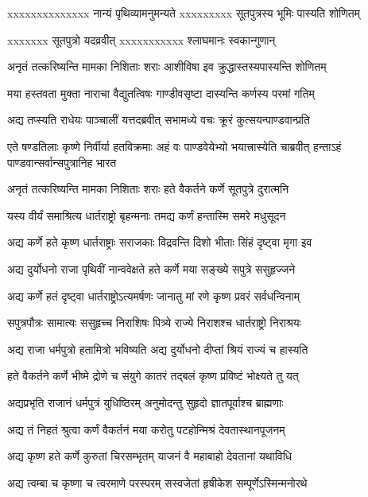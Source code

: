\twolineshloka
{xxxxxxxxxxxxxx नान्यं पृथिव्यामनुमन्यते}
{xxxxxxxxx सूतपुत्रस्य भूमिः पास्यति शोणितम्}


\twolineshloka
{xxxxxxx सूतपुत्रो यदव्रवीत्}
{xxxxxxxxxxx श्लाघमानः स्वकान्गुणान्}


\twolineshloka
{अनृतं तत्करिष्यन्ति मामका निशिताः शराः}
{आशीविषा इव क्रुद्धास्तस्यपास्यन्ति शोणितम्}


\twolineshloka
{मया हस्तवता मुक्ता नाराचा वैद्युतत्विषः}
{गाण्डीवसृष्टा दास्यन्ति कर्णस्य परमां गतिम्}


\twolineshloka
{अद्य तप्स्यति राधेयः पाञ्चालीं यत्तदब्रवीत्}
{सभामध्ये वचः क्रूरं कुत्सयन्पाण्डवान्प्रति}


\threelineshloka
{एते षण्डतिलाः कृष्णे निर्वीर्या हतविक्रमाः}
{अहं वः पाण्डवेयेभ्यो भयात्त्रास्येति चाब्रवीत्}
{हन्ताऽहं पाण्डवान्सर्वान्सपुत्रानिह भारत}


\twolineshloka
{अनृतं तत्करिष्यन्ति मामका निशिताः शराः}
{हते वैकर्तने कर्णे सूतपुत्रे दुरात्मनि}


\twolineshloka
{यस्य वीर्यं समाश्रित्य धार्तराष्ट्रो बृहन्मनाः}
{तमद्य कर्णं हन्तास्मि समरे मधुसूदन}


\twolineshloka
{अद्य कर्णे हते कृष्ण धार्तराष्ट्राः सराजकाः}
{विद्रवन्ति दिशो भीताः सिंहं दृष्ट्वा मृगा इव}


\twolineshloka
{अद्य दुर्योधनो राजा पृथिवीं नान्ववेक्षते}
{हते कर्णे मया सङ्ख्ये सपुत्रे ससुहृज्जने}


\twolineshloka
{अद्य कर्णे हतं दृष्ट्वा धार्तराष्ट्रोऽत्यमर्षणः}
{जानातु मां रणे कृष्ण प्रवरं सर्वधन्विनाम्}


\twolineshloka
{सपुत्रपौत्रः सामात्यः ससुहृच्च निराशिषः}
{पित्र्ये राज्ये निराशश्च धार्तराष्ट्रो निराश्रयः}


\twolineshloka
{अद्य राजा धर्मपुत्रो हतामित्रो भविष्यति}
{अद्य दुर्योधनो दीप्तां श्रियं राज्यं च हास्यति}


\twolineshloka
{हते वैकर्तने कर्णे भीष्मे द्रोणे च संयुगे}
{कातरं तद्बलं कृष्ण प्रविष्टं भोक्ष्यते तु यत्}


\twolineshloka
{अद्यप्रभृति राजानं धर्मपुत्रं युधिष्ठिरम्}
{अनुमोदन्तु सुहृदो ज्ञातपूर्वाश्च ब्राह्मणाः}


\twolineshloka
{अद्य तं निहतं श्रुत्वा कर्णं वैकर्तनं मया}
{करोतु पटहोन्मिश्रं देवतास्थानपूजनम्}


\twolineshloka
{अद्य कृष्ण हते कर्णे कुरुतां चिरसम्भृतम्}
{याजनं वै महाबाहो देवतानां यथाविधि}


\twolineshloka
{अद्य त्वम्बा च कृष्णा च त्वरमाणे परस्परम्}
{सस्वजेतां हृषीकेश सम्पूर्णेऽस्मिन्मनोरथे}


